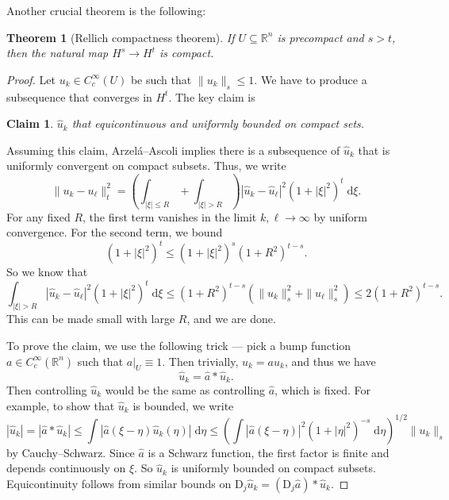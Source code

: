 \documentclass{shortart}
\newtheorem*{thm}{Theorem}
\newtheorem*{claim}{Claim}
\theoremstyle{definition}
\newcommand\R{\mathbb{R}}
\renewcommand\d{\mathrm{d}}
\newcommand\D{\mathrm{D}}
\begin{document}
Another crucial theorem is the following:
\begin{thm}[Rellich compactness theorem]
  If $U \subseteq \R^n$ is precompact and $s > t$, then the natural map $H^s \to H^t$ is compact.
\end{thm}
\begin{proof}
  Let $u_k \in C^\infty_c(U)$ be such that $\|u_k\|_s \leq 1$. We have to produce a subsequence that converges in $H^t$. The key claim is
  \begin{claim}
    $\hat{u}_k$ that equicontinuous and uniformly bounded on compact sets.
  \end{claim}
  Assuming this claim, Arzel\'a--Ascoli implies there is a subsequence of $\hat{u}_k$ that is uniformly convergent on compact subsets. Thus, we write
  \[
    \|u_k - u_\ell\|_t^2 = \left(\int_{|\xi|\leq R} + \int_{|\xi| > R}\right)|\hat{u}_k - \hat{u}_\ell|^2 (1 + |\xi|^2)^t \;\d \xi.
  \]
  For any fixed $R$, the first term vanishes in the limit $k, \ell \to \infty$ by uniform convergence. For the second term, we bound
  \[
    (1 + |\xi|^2)^t \leq (1 + |\xi|^2)^s (1 + R^2)^{t - s}.
  \]
  So we know that
  \[
    \int_{|\xi| > R}|\hat{u}_k - \hat{u}_\ell|^2 (1 + |\xi|^2)^t \;\d \xi \leq (1 + R^2)^{t - s}(\|u_k\|_s^2 + \|u_\ell\|_s^2) \leq 2 (1 + R^2)^{t - s}.
  \]
  This can be made small with large $R$, and we are done.

  To prove the claim, we use the following trick --- pick a bump function $a \in C_c^\infty(\R^n)$ such that $a|_U \equiv 1$. Then trivially, $u_k = au_k$, and thus we have
  \[
    \hat{u}_k = \hat{a} * \hat{u}_k.
  \]
  Then controlling $\hat{u}_k$ would be the same as controlling $\hat{a}$, which is fixed. For example, to show that $\hat{u}_k$ is bounded, we write
  \[
    |\hat{u}_k| = |\hat{a} * \hat{u}_k| \leq \int |\hat{a}(\xi - \eta) \hat{u}_k(\eta)|\;\d \eta \leq \left(\int |\hat{a} (\xi - \eta)|^2 (1 + |\eta|^2)^{-s}\;\d \eta\right)^{1/2} \|u_k\|_s
  \]
  by Cauchy--Schwarz. Since $\hat{a}$ is a Schwarz function, the first factor is finite and depends continuously on $\xi$. So $\hat{u}_k$ is uniformly bounded on compact subsets. Equicontinuity follows from similar bounds on $\D_j \hat{u}_k = (\D_j \hat{a}) * \hat{u}_k$.
\end{proof}
\end{document}
